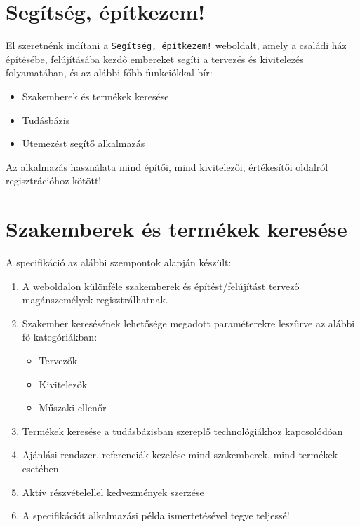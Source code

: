\section{Segítség, építkezem!}

El szeretnénk indítani a \texttt{Segítség, építkezem!} weboldalt, amely a családi
ház építésébe, felújításába kezdő embereket segíti a tervezés és
kivitelezés folyamatában, és az alábbi főbb funkciókkal bír:

\begin{itemize}
    \item Szakemberek és termékek keresése
    \item Tudásbázis
    \item Ütemezést segítő alkalmazás
\end{itemize}

Az alkalmazás használata mind építői, mind kivitelezői, értékesítői oldalról regisztrációhoz kötött!

\section{Szakemberek és termékek keresése}

A specifikáció az alábbi szempontok alapján készült:

\begin{enumerate}
    \item A weboldalon különféle szakemberek és építést/felújítást tervező magánszemélyek regisztrálhatnak.
    \item Szakember keresésének lehetősége megadott paraméterekre leszűrve az alábbi fő kategóriákban:
    \begin{itemize}
        \item Tervezők
        \item Kivitelezők
        \item Műszaki ellenőr
    \end{itemize}
    \item Termékek keresése a tudásbázisban szereplő technológiákhoz kapcsolódóan
    \item Ajánlási rendszer, referenciák kezelése mind szakemberek, mind termékek esetében
    \item Aktív részvételellel kedvezmények szerzése
    \item A specifikációt alkalmazási példa ismertetésével tegye teljessé!
\end{enumerate}
